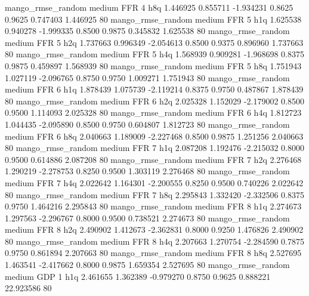 mango_rmse_random     medium      FFR                 4                  h8q  1.446925 0.855711 -1.934231 0.8625 0.9625  0.747403    1.446925 80
mango_rmse_random     medium      FFR                 5                  h1q  1.625538 0.940278 -1.999335 0.8500 0.9875  0.345832    1.625538 80
mango_rmse_random     medium      FFR                 5                  h2q  1.737663 0.996349 -2.054613 0.8500 0.9375  0.896960    1.737663 80
mango_rmse_random     medium      FFR                 5                  h4q  1.568939 0.909281 -1.968698 0.8375 0.9875  0.459897    1.568939 80
mango_rmse_random     medium      FFR                 5                  h8q  1.751943 1.027119 -2.096765 0.8750 0.9750  1.009271    1.751943 80
mango_rmse_random     medium      FFR                 6                  h1q  1.878439 1.075739 -2.119214 0.8375 0.9750  0.487867    1.878439 80
mango_rmse_random     medium      FFR                 6                  h2q  2.025328 1.152029 -2.179002 0.8500 0.9500  1.114093    2.025328 80
mango_rmse_random     medium      FFR                 6                  h4q  1.812723 1.044435 -2.095890 0.8500 0.9750  0.604807    1.812723 80
mango_rmse_random     medium      FFR                 6                  h8q  2.040663 1.189009 -2.227468 0.8500 0.9875  1.251256    2.040663 80
mango_rmse_random     medium      FFR                 7                  h1q  2.087208 1.192476 -2.215032 0.8000 0.9500  0.614886    2.087208 80
mango_rmse_random     medium      FFR                 7                  h2q  2.276468 1.290219 -2.278753 0.8250 0.9500  1.303119    2.276468 80
mango_rmse_random     medium      FFR                 7                  h4q  2.022642 1.164301 -2.200555 0.8250 0.9500  0.740226    2.022642 80
mango_rmse_random     medium      FFR                 7                  h8q  2.295843 1.332420 -2.332506 0.8375 0.9750  1.464216    2.295843 80
mango_rmse_random     medium      FFR                 8                  h1q  2.274673 1.297563 -2.296767 0.8000 0.9500  0.738521    2.274673 80
mango_rmse_random     medium      FFR                 8                  h2q  2.490902 1.412673 -2.362831 0.8000 0.9250  1.476826    2.490902 80
mango_rmse_random     medium      FFR                 8                  h4q  2.207663 1.270754 -2.284590 0.7875 0.9750  0.861894    2.207663 80
mango_rmse_random     medium      FFR                 8                  h8q  2.527695 1.463541 -2.417662 0.8000 0.9875  1.659354    2.527695 80
mango_rmse_random     medium      GDP                 1                  h1q  2.461655 1.362389 -0.979270 0.8750 0.9625  0.888221   22.923586 80
